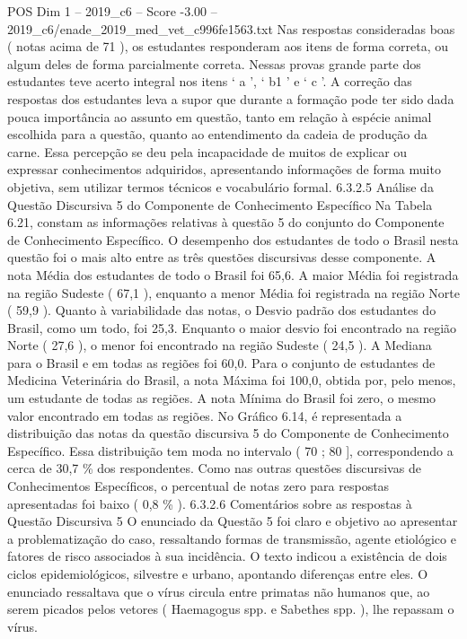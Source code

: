 \begin{textsample}{POS Dim 1 – 2019\_c6 – Score -3.00 – 2019\_c6/enade\_2019\_med\_vet\_c996fe1563.txt}
Nas respostas consideradas boas ( notas acima de 71 ), os estudantes responderam aos itens de forma correta, ou algum deles de forma parcialmente correta.
Nessas provas grande parte dos estudantes teve acerto integral nos itens ‘ a ’, ‘ b1 ’ e ‘ c ’.
A correção das respostas dos estudantes leva a supor que durante a formação pode ter sido dada pouca importância ao assunto em questão, tanto em relação à espécie animal escolhida para a questão, quanto ao entendimento da cadeia de produção da carne.
Essa percepção se deu pela incapacidade de muitos de explicar ou expressar conhecimentos adquiridos, apresentando informações de forma muito objetiva, sem utilizar termos técnicos e vocabulário formal. 6.3.2.5 Análise da Questão Discursiva 5 do Componente de Conhecimento Específico Na Tabela 6.21, constam as informações relativas à questão 5 do conjunto do Componente de Conhecimento Específico.
O desempenho dos estudantes de todo o Brasil nesta questão foi o mais alto entre as três questões discursivas desse componente.
A nota Média dos estudantes de todo o Brasil foi 65,6.
A maior Média foi registrada na região Sudeste ( 67,1 ), enquanto a menor Média foi registrada na região Norte ( 59,9 ).
Quanto à variabilidade das notas, o Desvio padrão dos estudantes do Brasil, como um todo, foi 25,3.
Enquanto o maior desvio foi encontrado na região Norte ( 27,6 ), o menor foi encontrado na região Sudeste ( 24,5 ).
A Mediana para o Brasil e em todas as regiões foi 60,0.
Para o conjunto de estudantes de Medicina Veterinária do Brasil, a nota Máxima foi 100,0, obtida por, pelo menos, um estudante de todas as regiões.
A nota Mínima do Brasil foi zero, o mesmo valor encontrado em todas as regiões.
No Gráfico 6.14, é representada a distribuição das notas da questão discursiva 5 do Componente de Conhecimento Específico.
Essa distribuição tem moda no intervalo ( 70 ; 80 ], correspondendo a cerca de 30,7 \% dos respondentes.
Como nas outras questões discursivas de Conhecimentos Específicos, o percentual de notas zero para respostas apresentadas foi baixo ( 0,8 \% ). 6.3.2.6 Comentários sobre as respostas à Questão Discursiva 5 O enunciado da Questão 5 foi claro e objetivo ao apresentar a problematização do caso, ressaltando formas de transmissão, agente etiológico e fatores de risco associados à sua incidência.
O texto indicou a existência de dois ciclos epidemiológicos, silvestre e urbano, apontando diferenças entre eles.
O enunciado ressaltava que o vírus circula entre primatas não humanos que, ao serem picados pelos vetores ( Haemagogus spp. e Sabethes spp. ), lhe repassam o vírus.

\end{textsample}
